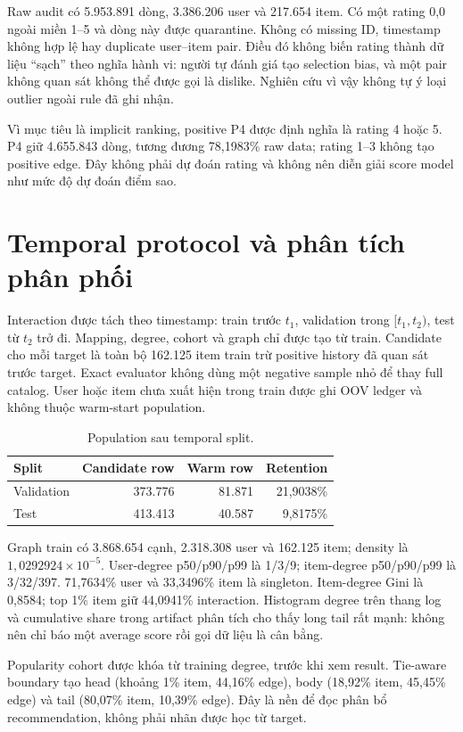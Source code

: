 \documentclass[12pt,a4paper]{article}
\begin{document}
Raw audit có 5.953.891 dòng, 3.386.206 user và 217.654 item. Có một rating 0,0 ngoài miền 1--5 và dòng này được quarantine. Không có missing ID, timestamp không hợp lệ hay duplicate user--item pair. Điều đó không biến rating thành dữ liệu ``sạch'' theo nghĩa hành vi: người tự đánh giá tạo selection bias, và một pair không quan sát không thể được gọi là dislike. Nghiên cứu vì vậy không tự ý loại outlier ngoài rule đã ghi nhận.

Vì mục tiêu là implicit ranking, positive P4 được định nghĩa là rating 4 hoặc 5. P4 giữ 4.655.843 dòng, tương đương 78,1983\% raw data; rating 1--3 không tạo positive edge. Đây không phải dự đoán rating và không nên diễn giải score model như mức độ dự đoán điểm sao.

\section{Temporal protocol và phân tích phân phối}
Interaction được tách theo timestamp: train trước $t_1$, validation trong $[t_1,t_2)$, test từ $t_2$ trở đi. Mapping, degree, cohort và graph chỉ được tạo từ train. Candidate cho mỗi target là toàn bộ 162.125 item train trừ positive history đã quan sát trước target. Exact evaluator không dùng một negative sample nhỏ để thay full catalog. User hoặc item chưa xuất hiện trong train được ghi OOV ledger và không thuộc warm-start population.

\begin{table}[h]
\centering
\caption{Population sau temporal split.}\label{tab:population}
\begin{tabular}{lrrr}
\toprule
Split & Candidate row & Warm row & Retention \\
\midrule
Validation & 373.776 & 81.871 & 21,9038\% \\
Test & 413.413 & 40.587 & 9,8175\% \\
\bottomrule
\end{tabular}
\end{table}

Graph train có 3.868.654 cạnh, 2.318.308 user và 162.125 item; density là $1,0292924\times10^{-5}$. User-degree p50/p90/p99 là 1/3/9; item-degree p50/p90/p99 là 3/32/397. 71,7634\% user và 33,3496\% item là singleton. Item-degree Gini là 0,8584; top 1\% item giữ 44,0941\% interaction. Histogram degree trên thang log và cumulative share trong artifact phân tích cho thấy long tail rất mạnh: không nên chỉ báo một average score rồi gọi dữ liệu là cân bằng.

Popularity cohort được khóa từ training degree, trước khi xem result. Tie-aware boundary tạo head (khoảng 1\% item, 44,16\% edge), body (18,92\% item, 45,45\% edge) và tail (80,07\% item, 10,39\% edge). Đây là nền để đọc phân bổ recommendation, không phải nhãn được học từ target.
\end{document}
